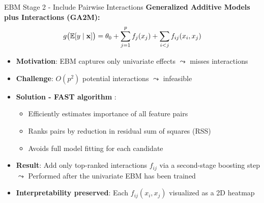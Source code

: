 \documentclass[11pt,compress,t,notes=noshow, aspectratio=169, xcolor=table]{beamer}
\begin{document}
\begin{frame}{EBM Stage 2 - Include Pairwise Interactions}
\textbf{Generalized Additive Models plus Interactions (GA2M):}
$$
g\big(\mathbb{E}[y \mid \mathbf{x}]\big) = \theta_0 + \sum_{j=1}^p f_j(x_j) + \sum_{i<j} f_{ij}(x_i, x_j)
$$

\begin{itemize}
    \item \textbf{Motivation}: EBM captures only univariate effects 
    $\leadsto$ misses interactions
    \item \textbf{Challenge}: $O(p^2)$ potential interactions
    $\leadsto$ infeasible %
    \item \textbf{Solution - FAST algorithm} :
    \begin{itemize}
        \item Efficiently estimates importance of all feature pairs
        \item Ranks pairs by reduction in residual sum of squares (RSS)
        \item Avoids full model fitting for each candidate
    \end{itemize}
    \item \textbf{Result}: Add only top-ranked interactions $f_{ij}$ via a second-stage boosting step\\
    $\leadsto$ Performed after the univariate EBM has been trained
    \item \textbf{Interpretability preserved}: Each $f_{ij}(x_i, x_j)$ visualized as a 2D heatmap
\end{itemize}
\end{frame}
\end{document}
